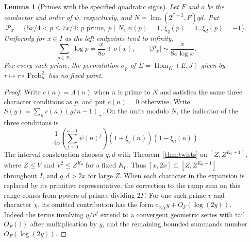 \documentclass[a4paper,11pt]{article}
\newtheorem{lemma}[proposition]{Lemma}
\theoremstyle{definition}
\theoremstyle{remark}
\newcommand{\Frob}{\operatorname{Frob}}\newcommand{\Gal}{\operatorname{Gal}}
\numberwithin{equation}{section}
\begin{document}
\begin{lemma}[Primes with the specified quadratic signs]\label{lem:primes53}
Let \(F\) and \(o\) be the conductor and order of \(\psi\), respectively,
and \(N=\operatorname{lcm}(2^{l'+2},F)qd\). Put
\[
 \mathcal P_x=\{5x/4<p\le7x/4:\ p\text{ prime},\ p\nmid N,\ 
           \psi(p)=1,\ \xi_q(p)=1,\ \xi_d(p)=-1\}.
\]
Uniformly for \(x\in I\) as the left endpoints tend to infinity,
\[
        \sum_{p\in\mathcal P_x}\log p=\frac{x}{8o}+o(x),
        \qquad |\mathcal P_x|\sim\frac{x}{8o\log x}.
\]
For every such prime, the permutation \(\sigma_p\) of
\(\Sigma=\operatorname{Hom}_K(E,J)\) given by
\(\tau\mapsto\tau\circ\Frob_p^2\) has no fixed point.
\end{lemma}
\begin{proof}
Write \(c(n)=\Lambda(n)\) when \(n\) is prime to \(N\) and satisfies
the same three character conditions as \(p\), and put \(c(n)=0\)
otherwise. Write \(S(y)=\sum_n c(n)(y/n-1)_+\).
On the units modulo \(N\), the indicator of the three conditions is
\[
     \frac{1}{4o}\left(\sum_{j=0}^{o-1}\psi(n)^j\right)
                         (1+\xi_q(n))(1-\xi_d(n)).
\]
The interval construction chooses \(q,d\) with
Theorem~\ref{thm:twists} on \([Z,Z^{K_0+1}]\), where \(Z\le V\)
and \(V^2\le Z^{K_0}\) for a fixed \(K_0\). Thus
\([x,2x]\subset[Z,Z^{K_0+1}]\) throughout \(I\), and \(q,d>2x\)
for large \(Z\). When each character in the expansion is replaced
by its primitive representative, the correction to the ramp sum
on this range comes from powers of primes dividing \(2F\).
For one such prime \(v\) and character \(\chi\), its omitted
contribution has the form \(c_{v,\chi}y+O_F(\log(2y))\).
Indeed the terms involving \(y/v^j\) extend to a convergent
geometric series with tail \(O_F(1)\) after multiplication by \(y\),
and the remaining bounded summands number \(O_F(\log(2y))\).


\end{proof}
\end{document}
